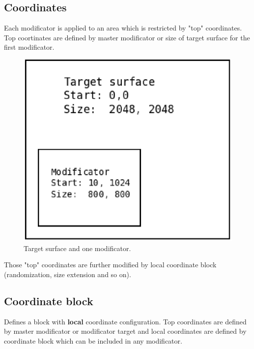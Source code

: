 \documentclass[9pt]{article}
\begin{document}
\subsection{Coordinates}
Each modificator is applied to an area which is restricted by "top" coordinates. 
Top coortinates are defined by master modificator or size of target surface 
for the first modificator.

\begin{figure}[h]
\begin{center}
  \includegraphics[scale=0.6]{p02.eps}
  \caption{Target surface and one modificator.}
\end{center}
\end{figure}

Those "top" coordinates are further modified by local
coordinate block (randomization, size extension
and so on).

\subsection{Coordinate block}
Defines a block with {\bf local} coordinate configuration. 
Top coordinates are defined by master modificator or modificator target and
local coordinates are defined by coordinate block which can be included in
any modificator.
\end{document}
